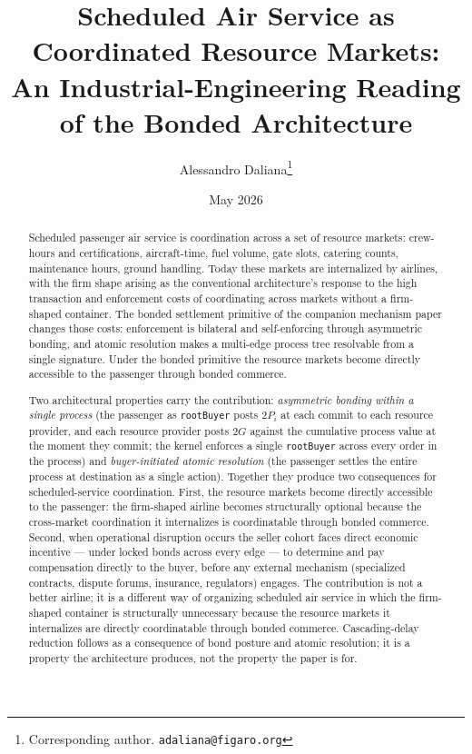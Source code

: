 \documentclass[11pt,a4paper]{article}
\title{%
  Scheduled Air Service as Coordinated Resource Markets:\\
  An Industrial-Engineering Reading of the Bonded Architecture%
}
\author{
  Alessandro Daliana\thanks{Corresponding author. \texttt{adaliana@figaro.org}}
}
\date{May 2026}
\theoremstyle{definition}
\theoremstyle{remark}
\begin{document}
\maketitle

\begin{abstract}
Scheduled passenger air service is coordination across a set of
resource markets: crew-hours and certifications, aircraft-time,
fuel volume, gate slots, catering counts, maintenance hours,
ground handling. Today these markets are internalized by
airlines, with the firm shape arising as the conventional
architecture's response to the high transaction and enforcement
costs of coordinating across markets without a firm-shaped
container. The bonded settlement primitive of the companion
mechanism paper changes those costs: enforcement is bilateral
and self-enforcing through asymmetric bonding, and atomic
resolution makes a multi-edge process tree resolvable from a
single signature. Under the bonded primitive the resource
markets become directly accessible to the passenger through
bonded commerce.

Two architectural properties carry the contribution:
\emph{asymmetric bonding within a single process} (the passenger
as \texttt{rootBuyer} posts $2P_i$ at each commit to each
resource provider, and each resource provider posts $2G$ against
the cumulative process value at the moment they commit; the
kernel enforces a single \texttt{rootBuyer} across every order in
the process) and \emph{buyer-initiated atomic resolution} (the
passenger settles the entire process at destination as a single
action). Together
they produce two consequences for scheduled-service coordination.
First, the resource markets become directly accessible to the
passenger: the firm-shaped airline becomes structurally optional
because the cross-market coordination it internalizes is
coordinatable through bonded commerce. Second, when operational
disruption occurs the seller cohort faces direct economic
incentive --- under locked bonds across every edge --- to
determine and pay compensation directly to the buyer, before any
external mechanism (specialized contracts, dispute forums,
insurance, regulators) engages. The contribution is not a better
airline; it is a different way of organizing scheduled air
service in which the firm-shaped container is structurally
unnecessary because the resource markets it internalizes are
directly coordinatable through bonded commerce. Cascading-delay
reduction follows as a consequence of bond posture and atomic
resolution; it is a property the architecture produces, not the
property the paper is for.
\end{abstract}
\end{document}
